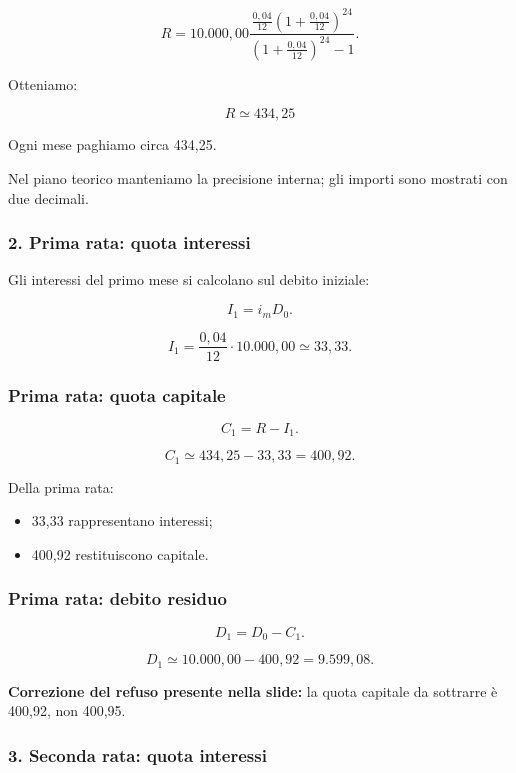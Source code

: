 \[
R=
10.000{,}00
\frac{
\frac{0{,}04}{12}
\left(1+\frac{0{,}04}{12}\right)^{24}
}{
\left(1+\frac{0{,}04}{12}\right)^{24}-1
}.
\]

\noindent Otteniamo:

\[
\boxed{R\simeq434{,}25}
\]

\noindent Ogni mese paghiamo
circa 434,25.

\noindent Nel piano teorico
manteniamo la precisione interna;
gli importi sono mostrati
con due decimali.


\subsubsection*{2. Prima rata: quota interessi}

\noindent Gli interessi del primo mese
si calcolano sul debito iniziale:

\[
I_1=i_mD_0.
\]

\[
I_1=
\frac{0{,}04}{12}\cdot10.000{,}00
\simeq
\boxed{33{,}33}.
\]


\subsubsection*{Prima rata: quota capitale}

\[
C_1=R-I_1.
\]

\[
C_1
\simeq
434{,}25-33{,}33
=
\boxed{400{,}92}.
\]

\noindent Della prima rata:

\begin{itemize}
    \item 33,33 rappresentano interessi;
    \item 400,92 restituiscono capitale.
\end{itemize}


\subsubsection*{Prima rata: debito residuo}

\[
D_1=D_0-C_1.
\]

\[
D_1
\simeq
10.000{,}00-400{,}92
=
\boxed{9.599{,}08}.
\]

\noindent \textbf{Correzione del refuso
presente nella slide:}
la quota capitale da sottrarre
è 400,92, non 400,95.


\subsubsection*{3. Seconda rata: quota interessi}

